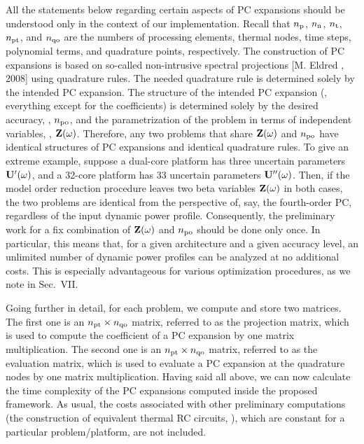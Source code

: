 \begin{authors}
All the statements below regarding certain aspects of PC expansions should be understood only in the context of our implementation.
Recall that ${n_\text{p}}$, ${n_\text{n}}$, ${n_\text{t}}$, ${n_\text{pt}}$, and ${n_\text{qo}}$ are the numbers of processing elements, thermal nodes, time steps, polynomial terms, and quadrature points, respectively.
The construction of PC expansions is based on so-called non-intrusive spectral projections [M. Eldred \etal, 2008] using quadrature rules.
The needed quadrature rule is determined solely by the intended PC expansion.
The structure of the intended PC expansion (\ie, everything except for the coefficients) is determined solely by the desired accuracy, \ie, ${n_\text{po}}$, and the parametrization of the problem in terms of independent variables, \ie, $\mathbf{Z}(\omega)$.
Therefore, any two problems that share $\mathbf{Z}(\omega)$ and ${n_\text{po}}$ have identical structures of PC expansions and identical quadrature rules.
To give an extreme example, suppose a dual-core platform has three uncertain parameters $\mathbf{U}'(\omega)$, and a 32-core platform has 33 uncertain parameters $\mathbf{U}''(\omega)$.
Then, if the model order reduction procedure leaves two beta variables $\mathbf{Z}(\omega)$ in both cases, the two problems are identical from the perspective of, say, the fourth-order PC, regardless of the input dynamic power profile.
Consequently, the preliminary work for a fix combination of $\mathbf{Z}(\omega)$ and ${n_\text{po}}$ should be done only once.
In particular, this means that, for a given architecture and a given accuracy level, an unlimited number of dynamic power profiles can be analyzed at no additional costs.
This is especially advantageous for various optimization procedures, as we note in Sec.~VII.

Going further in detail, for each problem, we compute and store two matrices.
The first one is an ${n_\text{pt}} \times {n_\text{qo}}$ matrix, referred to as the projection matrix, which is used to compute the coefficient of a PC expansion by one matrix multiplication.
The second one is an ${n_\text{pt}} \times {n_\text{qo}}$ matrix, referred to as the evaluation matrix, which is used to evaluate a PC expansion at the quadrature nodes by one matrix multiplication.
Having said all above, we can now calculate the time complexity of the PC expansions computed inside the proposed framework.
As usual, the costs associated with other preliminary computations (the construction of equivalent thermal RC circuits, \etc), which are constant for a particular problem/platform, are not included.


\end{authors}

